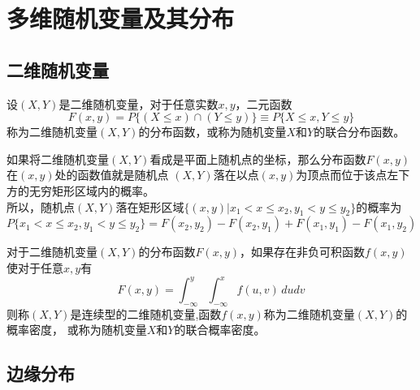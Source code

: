 \chapter{多维随机变量及其分布}

\section{二维随机变量}
\begin{definition}[联合分布函数]
    设$(X,Y)$是二维随机变量，对于任意实数$x,y$，二元函数
    $$F(x,y)=P\{(X\leq x)\cap(Y\leq y)\} \equiv P\{X\leq x,Y\leq y\}$$
    称为二维随机变量$(X,Y)$的{\heiti 分布函数}，或称为随机变量$X$和$Y$的{\heiti 联合分布函数}。

    如果将二维随机变量$(X,Y)$看成是平面上随机点的坐标，那么分布函数$F(x,y)$在$(x,y)$处的函数值就是随机点
    $(X,Y)$落在以点$(x,y)$为顶点而位于该点左下方的无穷矩形区域内的概率。
    \\所以，随机点$(X,Y)$落在矩形区域$\{(x,y)|x_1<x\leq x_2,y_1<y\leq y_2\}$的概率为
    $$P\{x_1<x\leq x_2,y_1<y\leq y_2\}=F(x_2,y_2)-F(x_2,y_1)+F(x_1,y_1)-F(x_1,y_2)$$
\end{definition}

\begin{definition}[联合概率密度]
    对于二维随机变量$(X,Y)$的分布函数$F(x,y)$，如果存在非负可积函数$f(x,y)$使对于任意$x,y$有
    $$F(x,y)=\int_{-\infty}^{y}\int_{-\infty}^x f(u,v)\,dudv$$
    则称$(X,Y)$是{\heiti 连续型的二维随机变量},函数$f(x,y)$称为二维随机变量$(X,Y)$的{\heiti 概率密度}，
    或称为随机变量$X$和$Y$的{\heiti 联合概率密度}。
\end{definition}

\section{边缘分布}
\begin{definition}
    
\end{definition}
